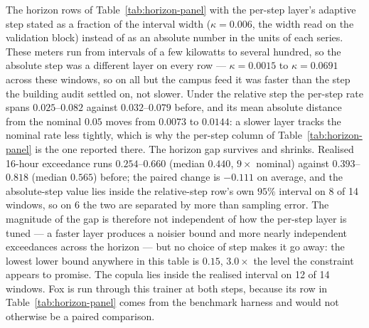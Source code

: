 \begin{table}[t]
\caption{The horizon rows of Table~\ref{tab:horizon-panel} with the per-step layer's adaptive step stated as a fraction of the interval width ($\kappa=0.006$, the width read on the validation block) instead of as an absolute number in the units of each series. These meters run from intervals of a few kilowatts to several hundred, so the absolute step was a different layer on every row --- $\kappa=0.0015$ to $\kappa=0.0691$ across these windows, so on all but the campus feed it was faster than the step the building audit settled on, not slower. Under the relative step the per-step rate spans $0.025$--$0.082$ against $0.032$--$0.079$ before, and its mean absolute distance from the nominal $0.05$ moves from $0.0073$ to $0.0144$: a slower layer tracks the nominal rate less tightly, which is why the per-step column of Table~\ref{tab:horizon-panel} is the one reported there. The horizon gap survives and shrinks. Realised 16-hour exceedance runs $0.254$--$0.660$ (median $0.440$, $9\times$ nominal) against $0.393$--$0.818$ (median $0.565$) before; the paired change is $-0.111$ on average, and the absolute-step value lies inside the relative-step row's own $95\%$ interval on 8 of 14 windows, so on 6 the two are separated by more than sampling error. The magnitude of the gap is therefore not independent of how the per-step layer is tuned --- a faster layer produces a noisier bound and more nearly independent exceedances across the horizon --- but no choice of step makes it go away: the lowest lower bound anywhere in this table is $0.15$, $3.0\times$ the level the constraint appears to promise. The copula lies inside the realised interval on 12 of 14 windows. Fox is run through this trainer at both steps, because its row in Table~\ref{tab:horizon-panel} comes from the benchmark harness and would not otherwise be a paired comparison.}
\label{tab:horizon-kappa}
\end{table}
